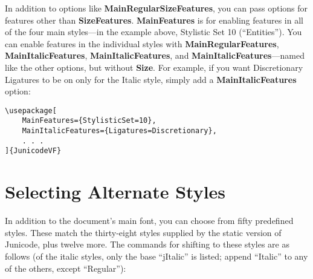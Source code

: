 \documentclass[12pt]{article}
\begin{document}
\noindent In addition to options like \textbf{MainRegularSizeFeatures},
you can pass options for features other than \textbf{SizeFeatures}.
\textbf{MainFeatures} is for enabling features in all of the four
main styles---in the example above, Stylistic Set 10 (“Entities”).
You can enable features in the individual styles with
\textbf{MainRegularFeatures}, \textbf{MainItalicFeatures},
\textbf{MainItalicFeatures}, and \textbf{MainItalicFeatures}---named 
like the other options, but without \textbf{Size}.
For example, if you want Discretionary Ligatures to be on only for the
Italic style, simply add a \textbf{MainItalicFeatures} option:

\footnotesize
\begin{verbatim}
\usepackage[
    MainFeatures={StylisticSet=10},
    MainItalicFeatures={Ligatures=Discretionary},
    . . .
]{JunicodeVF}
\end{verbatim}
\normalsize

\section{Selecting Alternate Styles}

In addition to the document's main font, you can choose from fifty
predefined styles. These match the thirty-eight styles supplied by the
static version of Junicode, plus twelve more. The commands for shifting to these
styles are as follows (of the italic styles, only the base “jItalic” is listed;
append “Italic” to any of the others, except “Regular”):
\end{document}
